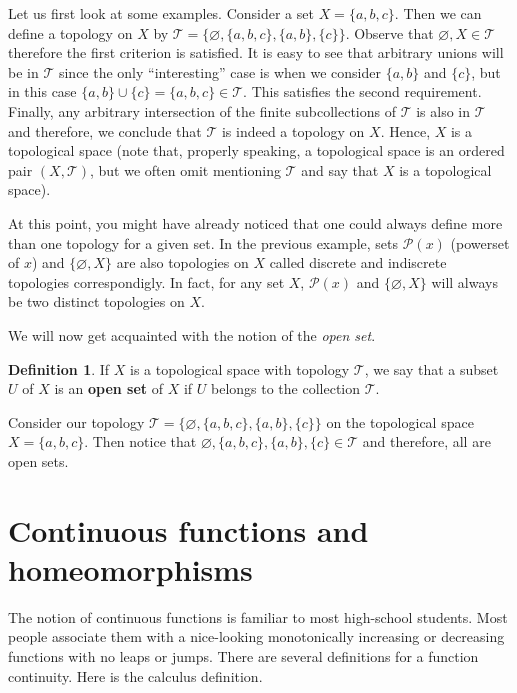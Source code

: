 \documentclass[a4paper, twocolumn]{article}
\newcommand{\pset}{\mathcal{P}}                  %
\newcommand{\topology}{\mathcal{T}}              %
\renewcommand{\emptyset}{\varnothing}            %
\theoremstyle{definition}
\newtheorem*{definition}{Definition}
\begin{document}
Let us first look at some examples. Consider a set $X = \{a, b, c\}$.
Then we can define a topology on $X$ by $\topology = \{\emptyset, \{a, b, c\}, \{a, b\}, \{c\}\}$.
Observe that $\emptyset, X \in \topology$ therefore the first criterion is satisfied.
It is easy to see that arbitrary unions will be in $\topology$ since the only ``interesting''
case is when we consider $\{a, b\}$ and $\{c\}$, but in this case $\{a, b\} \cup \{c\} = \{a, b, c\} \in \topology$.
This satisfies the second requirement. Finally, any arbitrary intersection of the finite subcollections of $\topology$
is also in $\topology$ and therefore, we conclude that $\topology$ is indeed a topology on $X$.
Hence, $X$ is a topological space (note that, properly speaking, a topological space is an ordered pair $(X, \topology)$,
but we often omit mentioning $\topology$ and say that $X$ is a topological space).

\medskip

At this point, you might have already noticed that one could always define more than one topology
for a given set. In the previous example, sets $\pset{(x)}$ (powerset of $x$) and $\{\emptyset, X\}$
are also topologies on $X$ called discrete and indiscrete topologies correspondigly. In fact, for any set $X$,
$\pset{(x)}$ and $\{\emptyset, X\}$ will always be two distinct topologies on $X$.

\medskip

We will now get acquainted with the notion of the \textit{open set}.

\begin{definition}
If $X$ is a topological space with topology $\topology$, we say that a subset $U$ of $X$ is an
\textbf{open set} of $X$ if $U$ belongs to the collection $\topology$.
\end{definition}

Consider our topology $\topology = \{\emptyset, \{a, b, c\}, \{a, b\}, \{c\}\}$ on the topological space $X = \{a, b, c\}$.
Then notice that $\emptyset, \{a, b, c\}, \{a, b\}, \{c\} \in \topology$ and therefore, all are open sets.


\section*{\centering Continuous functions and homeomorphisms}
The notion of continuous functions is familiar to most high-school students.
Most people associate them with a nice-looking monotonically increasing or decreasing
functions with no leaps or jumps. There are several definitions for a function continuity.
Here is the calculus definition.
\end{document}
